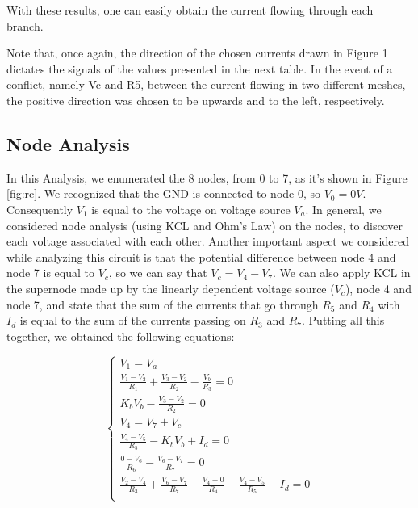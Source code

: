 With these results, one can easily obtain the current flowing through each branch.

Note that, once again, the direction of the chosen currents drawn in Figure 1 dictates the signals of the values presented in the next table. In the event of a conflict, namely Vc and R5, between the current flowing in two different meshes, the positive direction was chosen to be upwards and to the left, respectively.

%     


\subsection{Node Analysis}
In this Analysis, we enumerated the 8 nodes, from 0 to 7, as it's shown in Figure \ref{fig:rc}. We recognized that the GND is connected to node 0, so $V_{0}=0V$. Consequently $V_1$ is equal to the voltage on voltage source $V_a$. In general, we considered node analysis (using KCL and Ohm's Law) on the nodes, to discover each voltage associated with each other. Another important aspect we considered while analyzing this circuit is that the potential difference between node 4 and node 7 is equal to $V_c$, so we can say that $V_c=V_4-V_7$. We can also apply KCL in the supernode made up by the linearly dependent voltage source ($V_c$), node 4 and node 7, and state that the sum of the currents that go through $R_5$ and $R_4$ with $I_d$ is equal to the sum of the currents passing on $R_3$ and $R_7$.
Putting all this together, we obtained the following equations:

\begin{equation}
\begin{cases}
V_1=V_a\\
\frac{V_1-V_2}{R_1} + \frac{V_3-V_2}{R_2} - \frac{V_b}{R_3}=0\\
K_bV_b - \frac{V_3-V_2}{R_2}=0\\
V_4= V_7+V_c\\

\frac{V_4-V_5}{R_5} - K_bV_b + I_d=0\\

\frac{0-V_6}{R_6} - \frac{V_6-V_7}{R_7} = 0\\
\frac{V_2-V_4}{R_3} + \frac{V_6-V_7}{R_7} - \frac{V_4-0}{R_4}-\frac{V_4-V_5}{R_5}-I_d=0\\
\end{cases}
\end{equation}

